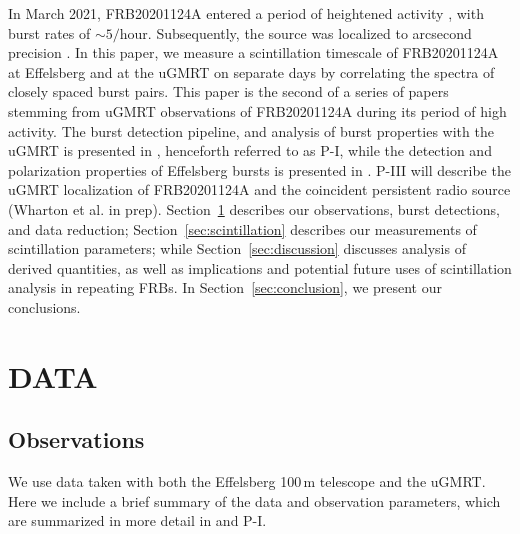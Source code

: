 \documentclass[fleqn,usenatbib]{mnras}
\newcommand{\blue}[1]{\textcolor{blue}{#1}}
\newcommand{\frb}{FRB20201124A}
\begin{document}
In March 2021, {\frb} entered a period of heightened activity \citep{chimeatel}, with burst rates of $\sim 5/$hour.  Subsequently, the source was localized to arcsecond precision \citep{askapatel, lawatel, whartonatel, marcoteatel}.  
In this paper, 
we measure a scintillation timescale of {\frb} at Effelsberg and at the uGMRT on separate days by correlating the spectra of closely spaced burst pairs.  This paper is the second of a series of papers stemming from uGMRT observations of {\frb} during its period of high activity.
The burst detection pipeline, and analysis of burst properties with the uGMRT is presented in \citet{marthi+21}, henceforth referred to as P-I, while the detection and polarization properties of Effelsberg bursts is presented in \citet{hilmarsson_Eff}.  
P-III will describe the uGMRT localization of \frb{} and the coincident persistent radio source (Wharton et al. in prep).
Section~\ref{sec:data} describes our observations, burst detections, and data reduction; Section~\ref{sec:scintillation} describes our measurements of scintillation parameters; while Section~\ref{sec:discussion} discusses analysis of derived quantities, as well as implications and potential future uses of scintillation analysis in repeating FRBs.  In Section~\ref{sec:conclusion}, we present our conclusions.


\section{DATA}
\label{sec:data}

\subsection{Observations}\label{sec:observations}

We use data taken with both the Effelsberg 100\,m telescope and the uGMRT.  Here we include a brief summary of the data and observation parameters, which are summarized in more detail in \citet{hilmarsson_Eff} and P-I.
\end{document}
